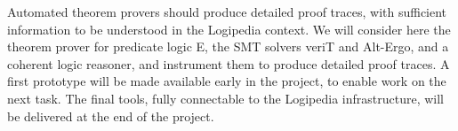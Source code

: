 \begin{workpackage}
\begin{tasklist}
\begin{task}[id=instrumenting,
      title=Instrumenting ATPs to produce traces,
      lead=Lie,
      LieRM=31,
      ImtRM=1,
      OcaRM=12,
      BelRM=6,
      StuRM=1,
      wphases=1-48!1.0
    ]
    Automated theorem provers should produce detailed proof traces, with
    sufficient information to be understood in the Logipedia context.  We will
    consider here the theorem prover for predicate logic E, the SMT solvers
    veriT and Alt-Ergo, and a
    coherent logic reasoner, and instrument them to produce detailed proof
    traces.  A first prototype will be made available early in the project, to
    enable work on the next task.  The final tools, fully connectable to the
    Logipedia infrastructure, will be delivered at the end of the project.








\end{task}



\end{tasklist}
\end{workpackage}

